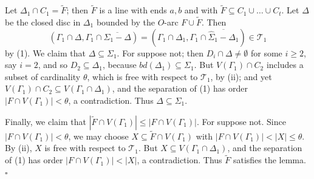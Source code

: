Let $\Delta_1 \cap C_1 = \tilde{F}$; then $\tilde{F}$ is a line with ends $a, b$ and with $\tilde{F} \subseteq C_1 \cup \dots \cup C_t$. Let $\Delta$ be the closed disc in $\Delta_1$ bounded by the $O$-arc $F \cup \tilde{F}$. Then
\begin{equation*}
(\Gamma_1 \cap \Delta, \Gamma_1 \cap \overline{\Sigma_1 - \Delta}) = (\Gamma_1 \cap \Delta_1, \Gamma_1 \cap \overline{\hat{\Sigma}_1 - \Delta_1}) \in \mathscr{T}_1
\end{equation*}
by (1). We claim that $\Delta \subseteq \Sigma_1$. For suppose not; then $D_i \cap \Delta \ne \emptyset$ for some $i \ge 2$, say $i = 2$, and so $D_2 \subseteq \Delta_1$, because $bd(\Delta_1) \subseteq \Sigma_1$. But $V(\Gamma_1) \cap C_2$ includes a subset of cardinality $\theta$, which is free with respect to $\mathscr{T}_1$, by (ii); and yet $V(\Gamma_1) \cap C_2 \subseteq V(\Gamma_1 \cap \Delta_1)$, and the separation of (1) has order $|F \cap V(\Gamma_1)| < \theta$, a contradiction. Thus $\Delta \subseteq \Sigma_1$.

Finally, we claim that $|\tilde{F} \cap V(\Gamma_1)| \le |F \cap V(\Gamma_1)|$. For suppose not. Since $|F \cap V(\Gamma_1)| < \theta$, we may choose $X \subseteq \tilde{F} \cap V(\Gamma_1)$ with $|F \cap V(\Gamma_1)| < |X| \le \theta$. By (ii), $X$ is free with respect to $\mathscr{T}_1$. But $X \subseteq V(\Gamma_1 \cap \Delta_1)$, and the separation of (1) has order $|F \cap V(\Gamma_1)| < |X|$, a contradiction. Thus $\tilde{F}$ satisfies the lemma. $\square$
